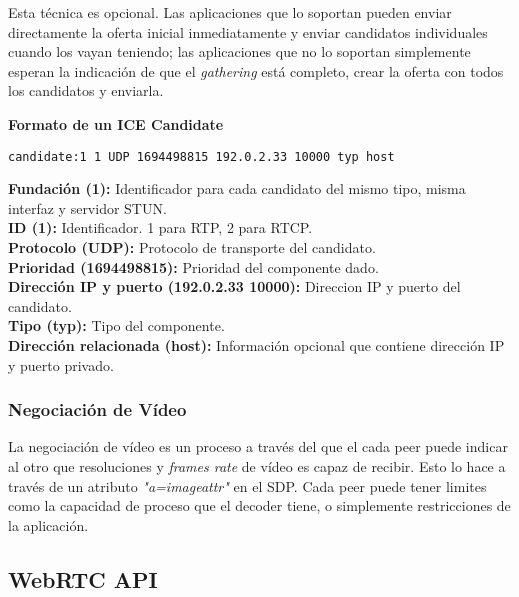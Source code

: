 Esta técnica es opcional. Las aplicaciones que lo soportan pueden enviar directamente la oferta inicial inmediatamente y enviar candidatos individuales cuando los vayan teniendo; las aplicaciones que no lo soportan simplemente esperan la indicación de que el \textit{gathering} está completo, crear la oferta con todos los candidatos y enviarla.\\


\begin{normalsize}
\noindent \textbf{Formato de un ICE Candidate}\\
\end{normalsize}

\begin{lstlisting}[caption=Ejemplo paquete SDP]
candidate:1 1 UDP 1694498815 192.0.2.33 10000 typ host
\end{lstlisting}

\noindent \textbf{Fundación (1):} Identificador para cada candidato del mismo tipo, misma interfaz y servidor STUN.\\
\textbf{ID (1):} Identificador. 1 para RTP, 2 para RTCP.\\
\textbf{Protocolo (UDP):} Protocolo de transporte del candidato.\\
\textbf{Prioridad (1694498815): }Prioridad del componente dado.\\
\textbf{Dirección IP y puerto (192.0.2.33 10000): }Direccion IP y puerto del candidato.\\
\textbf{Tipo (typ):} Tipo del componente.\\
\textbf{Dirección relacionada (host):} Información opcional que contiene dirección IP y puerto privado.\\

\subsubsection{Negociación de Vídeo}

La negociación de vídeo es un proceso a través del que el cada peer puede indicar al otro que resoluciones y \textit{frames rate} de vídeo es capaz de recibir. Esto lo hace a través de un atributo \textit{"a=imageattr"} en el SDP. Cada peer puede tener limites como la capacidad de proceso que el decoder tiene, o simplemente restricciones de la aplicación.\\


\subsection{WebRTC API}

